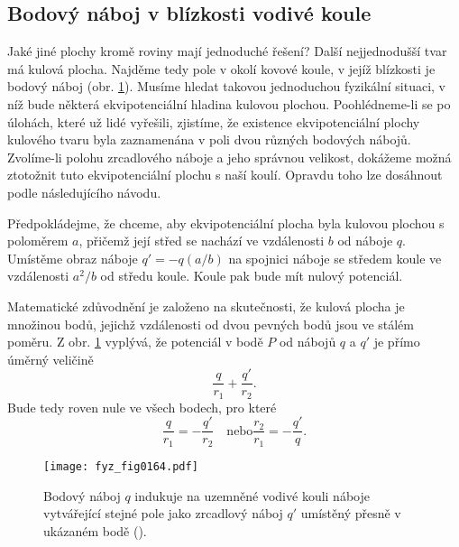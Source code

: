   \subsection{Bodový náboj v blízkosti vodivé koule}  %
    Jaké jiné plochy kromě roviny mají jednoduché řešení? Další nejjednodušší tvar má kulová 
    plocha. Najděme tedy pole v okolí kovové koule, v jejíž blízkosti je bodový náboj (obr. 
    \ref{fyz:fig0164}). Musíme hledat takovou jednoduchou fyzikální situaci, v níž bude některá 
    ekvipotenciální hladina kulovou plochou. Poohlédneme-li se po úlohách, které už lidé vyřešili, 
    zjistíme, že existence ekvipotenciální plochy kulového tvaru byla zaznamenána v poli dvou 
    různých bodových nábojů. Zvolíme-li polohu zrcadlového náboje a jeho správnou velikost, 
    dokážeme možná ztotožnit tuto ekvipotenciální plochu s naší koulí. Opravdu toho lze dosáhnout 
    podle následujícího návodu.
    
    Předpokládejme, že chceme, aby ekvipotenciální plocha byla kulovou plochou s poloměrem \(a\), 
    přičemž její střed se nachází ve vzdálenosti \(b\) od náboje \(q\). Umístěme obraz náboje \(q' 
    = -q(a/b)\) na spojnici náboje se středem koule ve vzdálenosti \(a^2/b\) od středu koule. Koule 
    pak bude mít nulový potenciál.
    
    Matematické zdůvodnění je založeno na skutečnosti, že kulová plocha je množinou bodů, jejichž 
    vzdálenosti od dvou pevných bodů jsou ve stálém poměru. Z obr. \ref{fyz:fig0164} vyplývá, že 
    potenciál v bodě \(P\) od nábojů \(q\) a \(q'\) je přímo úměrný veličině
    \begin{equation*}
      \dfrac{q}{r_1} + \dfrac{q'}{r_2}.
    \end{equation*}
    Bude tedy roven nule ve všech bodech, pro které
    \begin{equation*}
      \dfrac{q}{r_1} = -\dfrac{q'}{r_2} \quad\text{nebo} \dfrac{r_2}{r_1} = -\dfrac{q'}{q}.
    \end{equation*}
    
    \begin{figure}[ht!]  %
      \centering
      \texttt{[image: fyz\_fig0164.pdf]}
      \caption{Bodový náboj \(q\) indukuje na uzemněné vodivé kouli náboje vytvářející stejné pole 
               jako zrcadlový náboj \(q'\) umístěný přesně v ukázaném bodě 
               (\cite[s.~113]{Feynman02}).}
      \label{fyz:fig0164}
    \end{figure}
    
